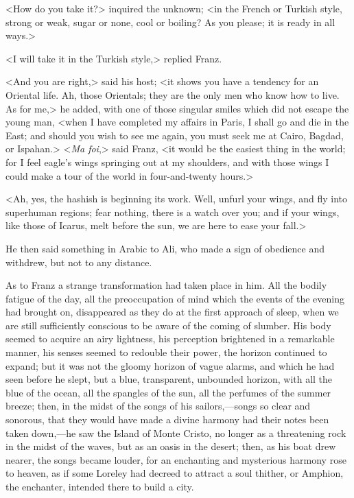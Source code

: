 <How do you take it?> inquired the unknown; <in the French or Turkish style, strong or weak, sugar or none, cool or boiling? As you please; it is ready in all ways.> 

 <I will take it in the Turkish style,> replied Franz. 

 <And you are right,> said his host; <it shows you have a tendency for an Oriental life. Ah, those Orientals; they are the only men who know how to live. As for me,> he added, with one of those singular smiles which did not escape the young man, <when I have completed my affairs in Paris, I shall go and die in the East; and should you wish to see me again, you must seek me at Cairo, Bagdad, or Ispahan.>  <\textit{Ma foi},> said Franz, <it would be the easiest thing in the world; for I feel eagle's wings springing out at my shoulders, and with those wings I could make a tour of the world in four-and-twenty hours.> 

 <Ah, yes, the hashish is beginning its work. Well, unfurl your wings, and fly into superhuman regions; fear nothing, there is a watch over you; and if your wings, like those of Icarus, melt before the sun, we are here to ease your fall.> 

 He then said something in Arabic to Ali, who made a sign of obedience and withdrew, but not to any distance. 

 As to Franz a strange transformation had taken place in him. All the bodily fatigue of the day, all the preoccupation of mind which the events of the evening had brought on, disappeared as they do at the first approach of sleep, when we are still sufficiently conscious to be aware of the coming of slumber. His body seemed to acquire an airy lightness, his perception brightened in a remarkable manner, his senses seemed to redouble their power, the horizon continued to expand; but it was not the gloomy horizon of vague alarms, and which he had seen before he slept, but a blue, transparent, unbounded horizon, with all the blue of the ocean, all the spangles of the sun, all the perfumes of the summer breeze; then, in the midst of the songs of his sailors,—songs so clear and sonorous, that they would have made a divine harmony had their notes been taken down,—he saw the Island of Monte Cristo, no longer as a threatening rock in the midst of the waves, but as an oasis in the desert; then, as his boat drew nearer, the songs became louder, for an enchanting and mysterious harmony rose to heaven, as if some Loreley had decreed to attract a soul thither, or Amphion, the enchanter, intended there to build a city. 

